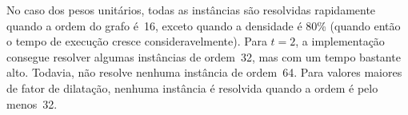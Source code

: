 No caso dos pesos unitários, todas as instâncias são resolvidas
rapidamente quando a ordem do grafo é~16, exceto quando a densidade é
80\% (quando então o tempo de execução cresce consideravelmente). Para
$t = 2$, a implementação consegue resolver algumas instâncias de ordem~32,
mas com um tempo bastante alto. Todavia, não resolve nenhuma instância
de ordem~64. Para valores maiores de fator de dilatação, nenhuma
instância é resolvida quando a ordem é pelo menos~32.



